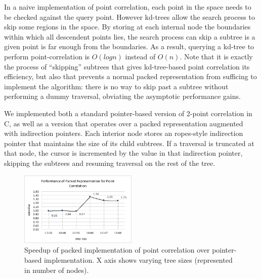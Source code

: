\documentclass[a4paper,english]{lipics-v2016}
\begin{document}
In a naive implementation of point correlation, each point in the space needs
to be checked against the query point. However kd-trees allow the search
process to skip some regions in the space. By storing at each internal node
the boundaries within which all descendent points lies, the search process can
skip a subtree is a given point is far enough from the boundaries. As a
result, querying a kd-tree to perform point-correlation is $O(log n)$ instead
of $O(n)$. Note that it is exactly the process of ``skipping'' subtrees that
gives kd-tree-based point correlation its efficiency, but also that prevents a
normal packed representation from sufficing to implement the algorithm: there
is no way to skip past a subtree without performing a dummy traversal,
obviating the asymptotic performance gains.

We implemented both a standard pointer-based version of 2-point correlation in
C, as well as a version that operates over a packed representation augmented
with indirection pointers. Each interior node stores an ropes-style
indirection pointer that maintains the size of its child subtrees. If a
traversal is truncated at that node, the cursor is incremented by the value in
that indirection pointer, skipping the subtrees and resuming traversal on the
rest of the tree.

  
\begin{figure}[htp]
    \centering
    \includegraphics[width=0.5\textwidth]{./figs/pointCorr_perf.pdf}


   \caption{Speedup of packed implementation of point correlation over pointer-based implementation. X axis shows varying tree sizes (represented in number of nodes).}
         \label{fig:pointCorr}
\end{figure}
\end{document}

